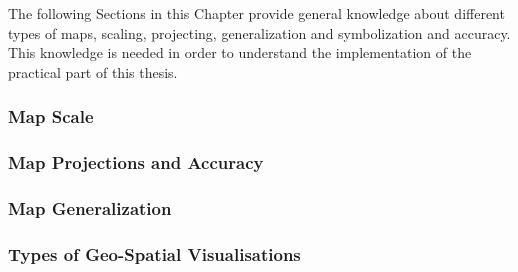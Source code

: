 The following Sections in this Chapter provide general knowledge about different types of maps, scaling, projecting, generalization and symbolization and accuracy. This knowledge is needed in order to understand the implementation of the practical part of this thesis.

\subsubsection{Map Scale}
\label{s:map-scale}


\subsubsection{Map Projections and Accuracy}

\label{s:map-projections}

\subsubsection{Map Generalization}


\subsubsection{Types of Geo-Spatial Visualisations}
\label{s:univariate-maps}
